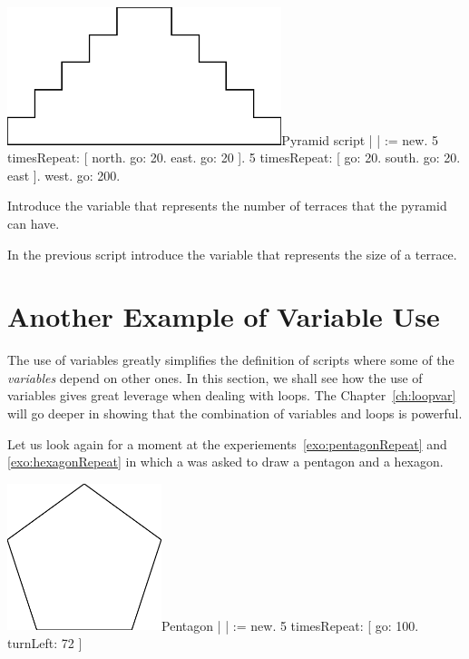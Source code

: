 \begin{scriptfigwithsize}[.45]{\includegraphics[width=8cm]{varPyramid}}{Pyramid script}
| \caro |
\caro := \Turtle new.
5 timesRepeat: 
               [ \caro north.
               \caro go: 20.
               \caro east.
               \caro go: 20 ].
5 timesRepeat: 
               [ \caro go: 20.
               \caro south.
               \caro go: 20.
               \caro east ].
\caro west.
\caro go: 200.
\end{scriptfigwithsize}


\begin{exonofig}
Introduce the variable  that represents the
 number of terraces that the pyramid can have. 
\end{exonofig}

\begin{exonofig}
In the previous script introduce the variable  that represents the size of a terrace.
\end{exonofig}
 
\section{Another Example of Variable Use}
The use of variables greatly simplifies the definition of scripts where some of the \emph{variables} depend on other ones. In this section, we shall see how the use of variables gives great leverage when dealing with loops. The Chapter~\ref{ch:loopvar} will go deeper in showing that the combination of variables and loops is powerful.

Let us look again for a moment at the experiements~\ref{exo:pentagonRepeat} and
\ref{exo:hexagonRepeat} in which a \Turtle was asked to draw a
pentagon and a hexagon. 

\begin{scriptfigwithsize}[.5]{\includegraphics[width=4.5cm]{varFPentagon}}{Pentagon}
| \caro |
\caro := \Turtle new.
5 timesRepeat: 
               [ \caro go: 100.
               \caro turnLeft: 72 ]
\end{scriptfigwithsize}

